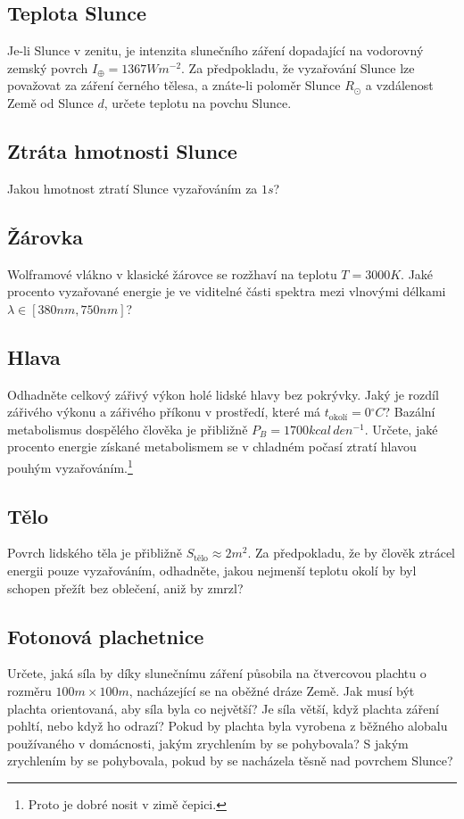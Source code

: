 \subsection{Teplota Slunce}
    Je-li Slunce v zenitu, je intenzita slunečního záření dopadající na vodorovný zemský povrch $I_{\oplus}=1367\unit{Wm^{-2}}$.
    Za předpokladu, že vyzařování Slunce lze považovat za záření černého tělesa, a znáte-li poloměr Slunce $R_{\odot}$ a vzdálenost Země od Slunce $d$, určete teplotu na povchu Slunce.

\subsection{Ztráta hmotnosti Slunce}
    Jakou hmotnost ztratí Slunce vyzařováním za $1\unit{s}$?

\subsection{Žárovka}
    Wolframové vlákno v klasické žárovce se rozžhaví na teplotu $T=3000\unit{K}$.
    Jaké procento vyzařované energie je ve viditelné části spektra mezi vlnovými délkami $\lambda\in[380\unit{nm},750\unit{nm}]$?

\subsection{Hlava}
    Odhadněte celkový zářivý výkon holé lidské hlavy bez pokrývky.
    Jaký je rozdíl zářivého výkonu a zářivého příkonu v prostředí, které má $t_{\text{okolí}}=0\unit{^\circ C}$?
    Bazální metabolismus dospělého člověka je přibližně $P_{B}=1700\unit{kcal\,den^{-1}}$.
    Určete, jaké procento energie získané metabolismem se v chladném počasí ztratí hlavou pouhým vyzařováním.\footnote{
        Proto je dobré nosit v zimě čepici.
    }

\subsection{Tělo}
    Povrch lidského těla je přibližně $S_{\text{tělo}}\approx2\unit{m^{2}}$.
    Za předpokladu, že by člověk ztrácel energii pouze vyzařováním, odhadněte, jakou nejmenší teplotu okolí by byl schopen přežít bez oblečení, aniž by zmrzl?
    
\subsection{Fotonová plachetnice}
    Určete, jaká síla by díky slunečnímu záření působila na čtvercovou plachtu o rozměru $100\unit{m}\times 100\unit{m}$, nacházející se na oběžné dráze Země. 
    Jak musí být plachta orientovaná, aby síla byla co největší?
    Je síla větší, když plachta záření pohltí, nebo když ho odrazí?
    Pokud by plachta byla vyrobena z běžného alobalu používaného v domácnosti, jakým zrychlením by se pohybovala?
    S jakým zrychlením by se pohybovala, pokud by se nacházela těsně nad povrchem Slunce?

